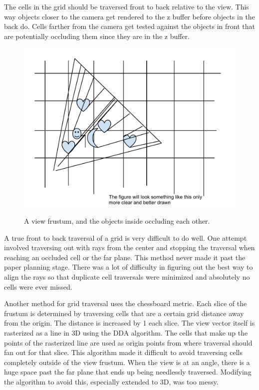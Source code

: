 \documentclass[12pt]{ucthesis}
\newcommand{\captionfonts}{\small\bf\ssp}
\begin{document}
The cells in the grid should be traversed front to back relative to the view.
This way objects closer to the camera get rendered to the z buffer before objects in the back do.
Cells farther from the camera get tested against the objects in front that are potentially occluding them since they are in the z buffer.

\begin{figure}
\begin{center}
\includegraphics[width=\textwidth]{Images/frustum.pdf}
\captionfonts
\caption[View Frustum and Occluders]{A view frustum, and the objects inside occluding each other.}
\label{fig:vf-and-occluders}
\end{center}
\end{figure}

A true front to back traversal of a grid is very difficult to do well.
One attempt involved traversing out with rays from the center and stopping the traversal when reaching an occluded cell or the far plane.
This method never made it past the paper planning stage.
There was a lot of difficulty in figuring out the best way to align the rays so that duplicate cell traversals were minimized and absolutely no cells were ever missed.

Another method for grid traversal uses the chessboard metric.\cite{chess}
Each slice of the frustum is determined by traversing cells that are a certain grid distance away from the origin.
The distance is increased by 1 each slice.
The view vector itself is rasterized as a line in 3D using the DDA algorithm.
The cells that make up the points of the rasterized line are used as origin points from where traversal should fan out for that slice.
This algorithm made it difficult to avoid traversing cells completely outside of the view frustum.
When the view is at an angle, there is a huge space past the far plane that ends up being needlessly traversed.
Modifying the algorithm to avoid this, especially extended to 3D, was too messy.
\end{document}
